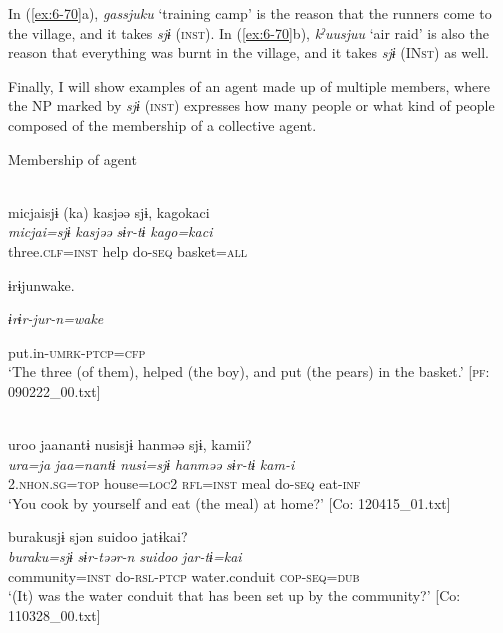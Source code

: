 \begin{table}
In (\ref{ex:6-70}a), \textit{gassjuku} ‘training camp’ is the reason that the runners come to the village, and it takes \textit{sjɨ} (\textsc{inst}). In (\ref{ex:6-70}b), \textit{kˀuusjuu} ‘air raid’ is also the reason that everything was burnt in the village, and it takes \textit{sjɨ} (IN\textsc{st}) as well.

Finally, I will show examples of an agent made up of multiple members, where the NP marked by \textit{sjɨ} (\textsc{inst}) expresses how many people or what kind of people composed of the membership of a collective agent.

\ea\label{ex:6-71}
  Membership of agent

 \ea{}\\
{\TM}
\glll  micjaisjɨ  (ka)  kasjəə  sjɨ,  kagokaci\\
\textit{micjai=sjɨ}    \textit{kasjəə}  \textit{sɨr-tɨ}  \textit{kago=kaci}\\
three.\textsc{clf}=\textsc{inst}    help  do-\textsc{seq}  basket=\textsc{all}

      ɨrɨjunwake.

      \textit{ɨrɨr-jur-n=wake}

      put.in-\textsc{umrk}-\textsc{ptcp}=\textsc{cfp}\\
\glt ‘The three (of them), helped (the boy), and put (the pears) in the basket.’ [\textsc{pf}: 090222\_00.txt]
\z

\ex{}\\
{\TM}
\glll  uroo  jaanantɨ  nusisjɨ  hanməə  sjɨ,  kamii?\\
\textit{ura=ja}  \textit{jaa=nantɨ}  \textit{nusi=sjɨ}  \textit{hanməə}  \textit{sɨr-tɨ}  \textit{kam-i}\\
2.\textsc{nhon}.\textsc{sg}=\textsc{top}  house=\textsc{loc}2  \textsc{rfl}=\textsc{inst}  meal  do-\textsc{seq}  eat-\textsc{inf}\\
\glt ‘You cook by yourself and eat (the meal) at home?’ [Co: 120415\_01.txt]
\z

\ex {\TM}  burakusjɨ  sjən  {\textbar}suidoo{\textbar}  jatɨkai?\\
\glll \textit{buraku=sjɨ}  \textit{sɨr-təər-n}  \textit{suidoo}  \textit{jar-tɨ=kai}\\
community=\textsc{inst}  do-\textsc{rsl}-\textsc{ptcp}  water.conduit  \textsc{cop}-\textsc{seq}=\textsc{dub}\\
\glt ‘(It) was the water conduit that has been set up by the community?’ [Co: 110328\_00.txt]
\z


\end{table}
